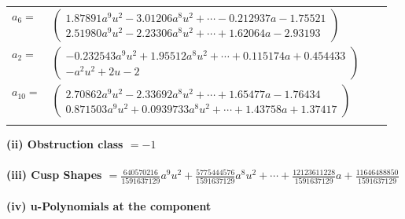 \documentclass[1p]{elsarticle_modified}
\theoremstyle{definition}
\begin{document}
\begin{tabular}{m{7pt} m{180pt} m{7pt} m{180pt} }
\flushright $a_{6}=$&$\begin{pmatrix}1.87891 a^{9} u^{2}-3.01206 a^{8} u^{2}+\cdots-0.212937 a-1.75521\\2.51980 a^{9} u^{2}-2.23306 a^{8} u^{2}+\cdots+1.62064 a-2.93193\end{pmatrix}$ \\
\flushright $a_{2}=$&$\begin{pmatrix}-0.232543 a^{9} u^{2}+1.95512 a^{8} u^{2}+\cdots+0.115174 a+0.454433\\- a^2 u^2+2 u-2\end{pmatrix}$ \\
\flushright $a_{10}=$&$\begin{pmatrix}2.70862 a^{9} u^{2}-2.33692 a^{8} u^{2}+\cdots+1.65477 a-1.76434\\0.871503 a^{9} u^{2}+0.0939733 a^{8} u^{2}+\cdots+1.43758 a+1.37417\end{pmatrix}$\\&\end{tabular}
\flushleft \textbf{(ii) Obstruction class $= -1$}\\~\\
\flushleft \textbf{(iii) Cusp Shapes $= \frac{640570216}{1591637129} a^9 u^2+\frac{5775444576}{1591637129} a^8 u^2+\cdots+\frac{12123611228}{1591637129} a+\frac{11646488850}{1591637129}$}\\~\\
\newpage\renewcommand{\arraystretch}{1}
\flushleft \textbf{(iv) u-Polynomials at the component}\newline \\
\end{document}

